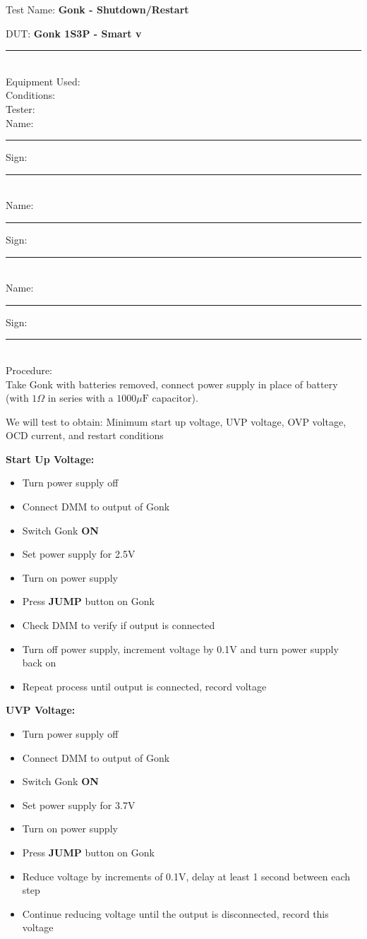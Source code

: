 \noindent
\setlength\parindent{0pt}

{\Huge Test Name: \textbf{Gonk - Shutdown/Restart}}\\[20pt]
{\Large DUT: \textbf{Gonk 1S3P - Smart v}\rule{1cm}{0.15mm}} \\[10pt]
{\Large Equipment Used: }\\[40pt]
{\Large Conditions: }\\[40pt]
{\Large Tester: }\\[10pt]
Name: \rule{4cm}{0.15mm} \hfill Sign: \rule{4cm}{0.15mm}\\[5pt]
Name: \rule{4cm}{0.15mm} \hfill Sign: \rule{4cm}{0.15mm}\\[5pt]
Name: \rule{4cm}{0.15mm} \hfill Sign: \rule{4cm}{0.15mm}\\[15pt]
{\Large Procedure: }\\
Take Gonk with batteries removed, connect power supply in place of battery (with $1\Omega$ in series with a $1000\mu \text{F}$ capacitor). 

We will test to obtain: Minimum start up voltage, UVP voltage, OVP voltage, OCD current, and restart conditions

{\Large \textbf{Start Up Voltage:}}
\begin{itemize}
\item Turn power supply off
\item Connect DMM to output of Gonk
\item Switch Gonk \textbf{ON} 
\item Set power supply for 2.5V
\item Turn on power supply
\item Press \textbf{JUMP} button on Gonk
\item Check DMM to verify if output is connected 
\item Turn off power supply, increment voltage by 0.1V and turn power supply back on
\item Repeat process until output is connected, record voltage 
\end{itemize}

{\Large \textbf{UVP Voltage:}}
\begin{itemize}
\item Turn power supply off
\item Connect DMM to output of Gonk
\item Switch Gonk \textbf{ON} 
\item Set power supply for 3.7V
\item Turn on power supply
\item Press \textbf{JUMP} button on Gonk
\item Reduce voltage by increments of 0.1V, delay at least 1 second between each step
\item Continue reducing voltage until the output is disconnected, record this voltage 
\end{itemize}

